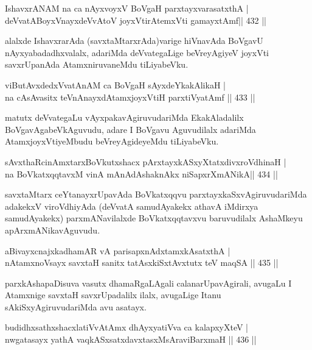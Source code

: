 \begin{shl}
IshavxrANAM na ca nAyxvoyxV BoVgaH parxtayxvarasatxthA | \\
deVvatABoyxV\s nayxdeVvAtoV joyxVtirAtemxVti gamayxtAmf\hfill ||  432 ||  
\end{shl}

\begin{artha}
alalxde IshavxrarAda (savxtaMtarxrAda)varige hiVnavAda BoVgavU nAyxyabadadhxvalalx, adariMda deVvategaLige beVreyAgiyeV joyxVti savxrUpanAda AtamxniruvaneMdu tiLiyabeVku. 
\end{artha}

\begin{shl}
viButAvxdedxVvatAnAM ca BoVgaH sAyxdeYkakAlikaH | \\
na cAsAvasitx teVnAnayxdAtamxjoyxVtiH parxtiVyatAmf \hfill||  433 ||  
\end{shl}

\begin{artha}
matutx deVvategaLu vAyxpakavAgiruvudariMda EkakAladalilx BoVgavAgabeVkAguvudu, adare I BoVgavu Aguvudilalx adariMda AtamxjoyxVtiyeMbudu beVreyAgideyeMdu tiLiyabeVku.
\end{artha}

\begin{shl}
sAvxthaRcinAmxtarxBoVkutxshacx pArxtayxkASxyXtatxdivxroVdhinaH | \\
na BoVkatxqqtavxM vinA mAnAdAshaknAkx niSapxrXmANikA\hfill ||  434 ||  
\end{shl}

\begin{artha}
savxtaMtarx ceYtanayxrUpavAda BoVkatxqqvu parxtayxkaSxvAgiruvudariMda adakekxV viroVdhiyAda (deVvatA samudAyakekx athavA iMdirxya samudAyakekx) parxmANavilalxde BoVkatxqqtavxvu baruvudilalx AshaMkeyu apArxmANikavAguvudu.
\end{artha}

\begin{shl}
aBivayxcnajxkadhamAR vA parisapxnAdxtamxkAsatxthA | \\
nA\s \s tamxnoV\s sayx savxtaH sanitx tatAsxkiSxtAvxtutx teV maqSA \hfill||  435 ||  
\end{shl}

\begin{artha}
parxkAshapaDisuva vasutx dhamaRgaLAgali calanarUpavAgirali, avugaLu I Atamxnige savxtaH savxrUpadalilx ilalx, avugaLige Itanu sAkiSxyAgiruvudariMda avu asatayx.
\end{artha}

\begin{shl}
budidhxsathxshacxlatiVvA\s \s tAmx dhAyxyatiVva ca kalapxyXteV | \\
nwgatasayx yathA vaqkASxsatxdavxtasxMsAraviBarxmaH \hfill||  436 ||  
\end{shl}

